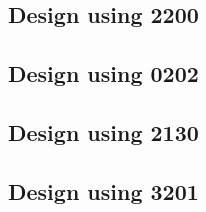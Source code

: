 \subsection{Design using 2200}


 \begin{center}




 \end{center}



\subsection{Design using 0202}


 \begin{center}




 \end{center}



\subsection{Design using 2130}


 \begin{center}




 \end{center}



\subsection{Design using 3201}


